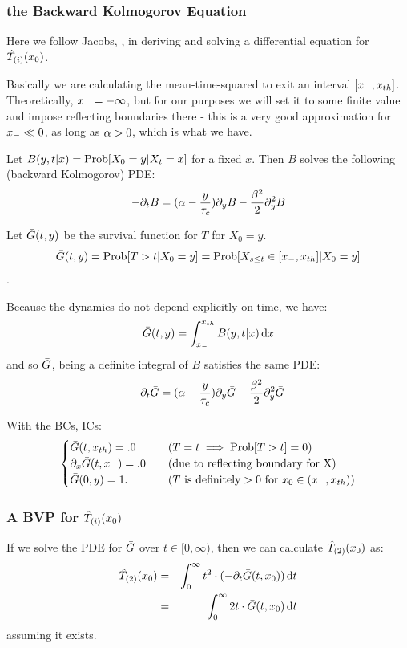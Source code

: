 \documentclass{article}
\begin{document}
\subsubsection{the Backward Kolmogorov Equation}
Here we follow Jacobs, \cite{Jacobs}, in deriving and solving a differential
equation for ${ \hat{T}_{(i)} }(x_0)$.

Basically we are calculating the mean-time-squared to exit an interval $[{ x_{-} },
{ x_{th} }]$. Theoretically, ${ x_{-} } = -\infty$, but for our purposes we will set it to
some finite value and impose reflecting boundaries there - this is a very good
approximation for ${ x_{-} } \ll 0$, as long as ${\alpha}>0$, which is what we have. 

Let $B(y,t|x) = \operatorname{Prob}[X_0 = y| X_t = x]$ for a fixed $x$. Then $B$ solves the
following (backward Kolmogorov) PDE:
\begin{equation}
-{\partial}_t B = ({\alpha} - \frac y{{ \tau_{c} }}){\partial}_yB - \frac {{\beta}^2} 2 {\partial}_y^2 B
\label{eq:backward_Xdensity}
\end{equation}

Let ${ \bar{G} }(t,y)$ be the survival function for $T$ for $X_0 = y$. 
$${ \bar{G} }(t,y) = \operatorname{Prob}[T>t | X_0 = y] = \operatorname{Prob}[X_{s\leq t} \in [{ x_{-} },
{ x_{th} }] | X_0 = y]$$.

Because the dynamics do not depend explicitly on time, we have:
$$
{ \bar{G} }(t,y) = \int_{ x_{-} }^{ x_{th} } B(y,t|x) \, \mathrm{d} x
$$
and so ${ \bar{G} }$, being a definite integral of $B$ satisfies the same PDE:
\begin{equation}
-{\partial}_t { \bar{G} } = ({\alpha} - \frac y{{ \tau_{c} }}) {\partial}_y{ \bar{G} } - \frac {{\beta}^2} 2 {\partial}_y^2 { \bar{G} }
\label{eq:backward_SDF}
\end{equation}

With the BCs, ICs:
\begin{equation}
\begin{cases}
{ \bar{G} }(t,{ x_{th} }) = .0 & \quad (T = t \implies \operatorname{Prob}[T>t] = 0)
\\
{\partial}_x { \bar{G} }(t,{ x_{-} }) = .0  & \quad (\textrm{due to reflecting boundary for X})
\\
{ \bar{G} }(0, y) = 1. & \quad (T \textrm{ is definitely} > 0 \textrm{ for } x_0 \in
({ x_{-} }, { x_{th} }) )
\end{cases}
\end{equation}

\subsubsection{A BVP for ${ \hat{T}_{(i)} }(x_0)$}
If we solve the PDE for ${ \bar{G} }$ over $t \in [0,\infty)$, then we can calculate
${ \hat{T}_{(2)} }(x_0)$ as:
\begin{eqnarray}
{ \hat{T}_{(2)} }(x_0) &=& \int_0^\infty t^2 \cdot (-{\partial}_t{ \bar{G} }(t,x_0)) \, \mathrm{d} t
\\
		   &=& \int_0^\infty 2t \cdot { \bar{G} }(t,x_0) \, \mathrm{d} t
\end{eqnarray}
assuming it exists.
\end{document}
